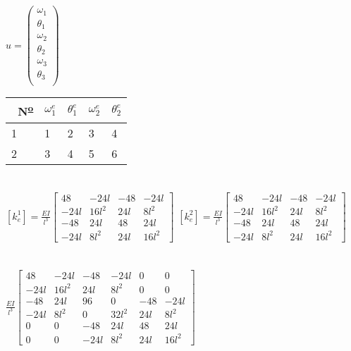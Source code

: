 \documentclass{article}
\title{}
\begin{document}
\section{}

${u} = \begin{pmatrix}
\omega_{1} \\
\theta_{1} \\
\omega_{2} \\
\theta_{2} \\
\omega_{3} \\
\theta_{3} \\
\end{pmatrix}$ \quad \quad
\begin{tabular}{|l|l|l|l|l|}
\hline
\ N\textsuperscript{\underline{\scriptsize o}} & $\omega_{1}^e$ & $\theta_{1}^e$ & $\omega_{2}^e$ & $\theta_{2}^e$ \\ \hline
1 & 1  & 2 & 3 & 4  \\ \hline
2 & 3 & 4 & 5 & 6 \\ \hline
\end{tabular}
\section{}
\([k_{e}^1] =
\frac{EI}{l^{3}}
\left[\begin{matrix}48 & - 24 l & -48 & - 24 l\\- 24 l & 16 l^{2} & 24 l & 8 l^{2}\\-48 & 24 l & 48 & 24 l\\- 24 l & 8 l^{2} & 24 l & 16 l^{2}\end{matrix}\right]
\) \quad
\([k_{e}^2] =
\frac{EI}{l^{3}}
\left[\begin{matrix}48 & - 24 l & -48 & - 24 l\\- 24 l & 16 l^{2} & 24 l & 8 l^{2}\\-48 & 24 l & 48 & 24 l\\- 24 l & 8 l^{2} & 24 l & 16 l^{2}\end{matrix}\right]
\)
\section{}
$
\frac{EI}{l^{3}}\left[\begin{matrix}48 & - 24 l & -48 & - 24 l & 0 & 0\\- 24 l & 16 l^{2} & 24 l & 8 l^{2} & 0 & 0\\-48 & 24 l & 96 & 0 & -48 & - 24 l\\- 24 l & 8 l^{2} & 0 & 32 l^{2} & 24 l & 8 l^{2}\\0 & 0 & -48 & 24 l & 48 & 24 l\\0 & 0 & - 24 l & 8 l^{2} & 24 l & 16 l^{2}\end{matrix}\right]
$
\end{document}
